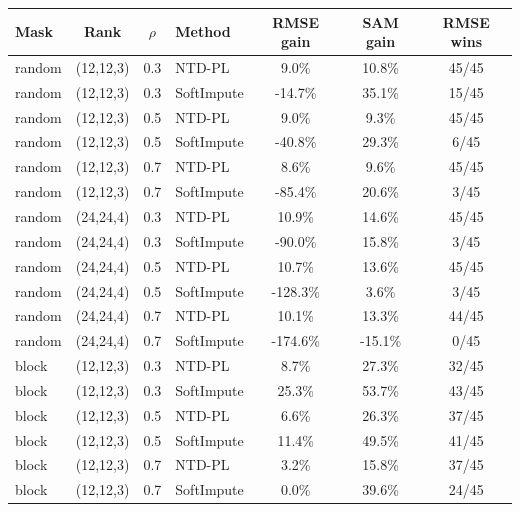\begin{tabular}{@{}l c c l c c c@{}}
\toprule
Mask & Rank & $\rho$ & Method & RMSE gain & SAM gain & RMSE wins\\
\midrule
random & (12,12,3) & 0.3 & NTD-PL & 9.0\% & 10.8\% & 45/45\\
random & (12,12,3) & 0.3 & SoftImpute & -14.7\% & 35.1\% & 15/45\\
random & (12,12,3) & 0.5 & NTD-PL & 9.0\% & 9.3\% & 45/45\\
random & (12,12,3) & 0.5 & SoftImpute & -40.8\% & 29.3\% & 6/45\\
random & (12,12,3) & 0.7 & NTD-PL & 8.6\% & 9.6\% & 45/45\\
random & (12,12,3) & 0.7 & SoftImpute & -85.4\% & 20.6\% & 3/45\\
random & (24,24,4) & 0.3 & NTD-PL & 10.9\% & 14.6\% & 45/45\\
random & (24,24,4) & 0.3 & SoftImpute & -90.0\% & 15.8\% & 3/45\\
random & (24,24,4) & 0.5 & NTD-PL & 10.7\% & 13.6\% & 45/45\\
random & (24,24,4) & 0.5 & SoftImpute & -128.3\% & 3.6\% & 3/45\\
random & (24,24,4) & 0.7 & NTD-PL & 10.1\% & 13.3\% & 44/45\\
random & (24,24,4) & 0.7 & SoftImpute & -174.6\% & -15.1\% & 0/45\\
block & (12,12,3) & 0.3 & NTD-PL & 8.7\% & 27.3\% & 32/45\\
block & (12,12,3) & 0.3 & SoftImpute & 25.3\% & 53.7\% & 43/45\\
block & (12,12,3) & 0.5 & NTD-PL & 6.6\% & 26.3\% & 37/45\\
block & (12,12,3) & 0.5 & SoftImpute & 11.4\% & 49.5\% & 41/45\\
block & (12,12,3) & 0.7 & NTD-PL & 3.2\% & 15.8\% & 37/45\\
block & (12,12,3) & 0.7 & SoftImpute & 0.0\% & 39.6\% & 24/45\\
\bottomrule
\end{tabular}
